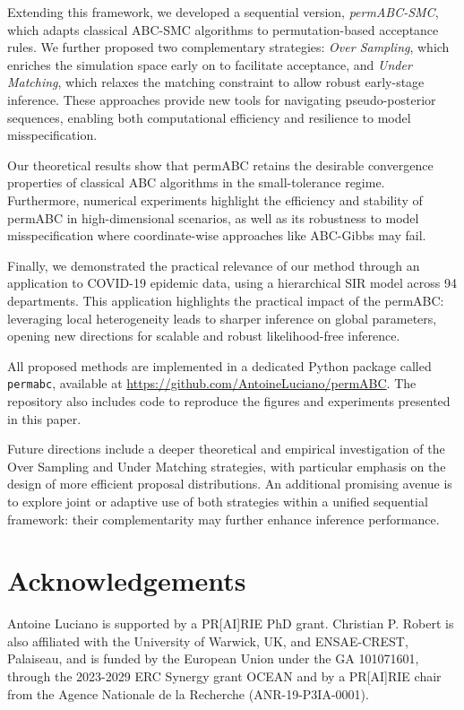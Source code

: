 \documentclass[11pt,a4paper]{article}
\theoremstyle{plain}
\theoremstyle{definition}
\theoremstyle{remark}
\begin{document}
Extending this framework, we developed a sequential version, \emph{permABC-SMC}, which adapts classical ABC-SMC algorithms to permutation-based acceptance rules. We further proposed two complementary strategies: \emph{Over Sampling}, which enriches the simulation space early on to facilitate acceptance, and \emph{Under Matching}, which relaxes the matching constraint to allow robust early-stage inference. These approaches provide new tools for navigating pseudo-posterior sequences, enabling both computational efficiency and resilience to model misspecification.

Our theoretical results show that permABC retains the desirable convergence properties of classical ABC algorithms in the small-tolerance regime. Furthermore, numerical experiments highlight the efficiency and stability of permABC in high-dimensional scenarios, as well as its robustness to model misspecification where coordinate-wise approaches like ABC-Gibbs may fail.

Finally, we demonstrated the practical relevance of our method through an application to COVID-19 epidemic data, using a hierarchical SIR model across 94 departments. This application highlights the practical impact of the permABC: leveraging local heterogeneity leads to sharper inference on global parameters, opening new directions for scalable and robust likelihood-free inference.

All proposed methods are implemented in a dedicated Python package called \texttt{permabc}, available at \url{https://github.com/AntoineLuciano/permABC}. The repository also includes code to reproduce the figures and experiments presented in this paper.

Future directions include a deeper theoretical and empirical investigation of the Over Sampling and Under Matching strategies, with particular emphasis on the design of more efficient proposal distributions. An additional promising avenue is to explore joint or adaptive use of both strategies within a unified sequential framework: their complementarity may further enhance inference performance.

\section*{Acknowledgements}

Antoine Luciano is supported by a PR[AI]RIE PhD grant. Christian P. Robert is also affiliated with the University of Warwick, UK, and ENSAE-CREST, Palaiseau, and is funded by the European Union under the GA 101071601, through the 2023-2029 ERC Synergy grant OCEAN and by a PR[AI]RIE chair from the Agence Nationale de la Recherche (ANR-19-P3IA-0001).
\end{document}
